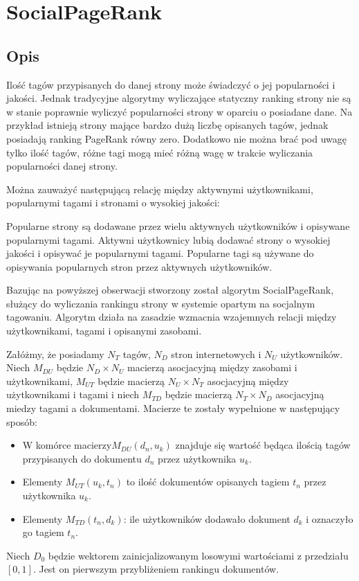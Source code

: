 \section{SocialPageRank}
\subsection{Opis}

Ilość tagów przypisanych do danej strony może świadczyć o jej popularności i jakości. Jednak tradycyjne algorytmy wyliczające statyczny ranking strony nie są w stanie poprawnie wyliczyć popularności strony w oparciu o posiadane dane. Na przykład istnieją strony mające bardzo dużą liczbę opisanych tagów, jednak posiadają ranking PageRank równy zero. Dodatkowo nie można brać pod uwagę tylko ilość tagów, różne tagi mogą mieć różną wagę w trakcie wyliczania popularności danej strony. 

Można zauważyć następującą relację między aktywnymi użytkownikami, popularnymi tagami i stronami o wysokiej jakości:
\begin{Observ}
Popularne strony są dodawane przez wielu aktywnych użytkowników i opisywane popularnymi tagami. Aktywni użytkownicy lubią dodawać strony o wysokiej jakości i opisywać je popularnymi tagami. Popularne tagi są używane do opisywania popularnych stron przez aktywnych użytkowników.
\end{Observ}

Bazując na powyższej obserwacji stworzony został algorytm SocialPageRank, służący do wyliczania rankingu strony w systemie opartym na socjalnym tagowaniu. Algorytm działa na zasadzie wzmacnia wzajemnych relacji między użytkownikami, tagami i opisanymi zasobami.

Załóżmy, że posiadamy $N_T$ tagów, $N_D$ stron internetowych i $N_U$ użytkowników. Niech $M_{DU}$ będzie  $N_D \times N_U$  macierzą asocjacyjną między zasobami i użytkownikami, $M_{UT}$ będzie macierzą $N_U \times N_T$ asocjacyjną między użytkownikami i tagami i niech $M_{TD}$ będzie macierzą  $N_T \times N_D$  asocjacyjną miedzy tagami a dokumentami. Macierze te zostały wypełnione w następujący sposób:
\begin{itemize}
\item W komórce macierzy$M_{DU}(d_n, u_k)$ znajduje się wartość będąca ilością tagów przypisanych do dokumentu $d_n$ przez użytkownika $u_k$. 
\item Elementy $M_{UT}(u_k, t_n)$ to ilość dokumentów opisanych tagiem $t_n$ przez użytkownika $u_k$.
\item Elementy $M_{TD}(t_n, d_k)$: ile użytkowników dodawało dokument $d_k$ i oznaczyło go tagiem $t_n$. 
\end{itemize}
Niech $D_0$ będzie wektorem zainicjalizowanym losowymi wartościami z przedziału $[0,1]$. Jest on pierwszym przybliżeniem rankingu dokumentów.

